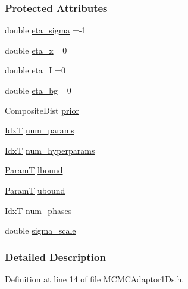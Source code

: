 \subsubsection*{Protected Attributes}
\begin{DoxyCompactItemize}
\item 
double \hyperlink{classmappel_1_1MCMCAdaptor1Ds_adecf7d63c176c03493f914b544895c1c}{eta\+\_\+sigma} =-\/1
\item 
double \hyperlink{classmappel_1_1MCMCAdaptor1D_ae5787e38c9cef6168acf6fc5d3216693}{eta\+\_\+x} =0
\item 
double \hyperlink{classmappel_1_1MCMCAdaptor1D_a5780d326be0c40e10d6c91777cfffbd3}{eta\+\_\+I} =0
\item 
double \hyperlink{classmappel_1_1MCMCAdaptor1D_af54c93421b8e298289cbb92743c6b3d5}{eta\+\_\+bg} =0
\item 
Composite\+Dist \hyperlink{classmappel_1_1PointEmitterModel_a393839f8eb1dd3d61c9369377742ba0e}{prior}
\item 
\hyperlink{namespacemappel_ab17ec0f30b61ece292439d7ece81d3a8}{IdxT} \hyperlink{classmappel_1_1PointEmitterModel_a9af0484391bd6021ddc04ac666ab49ad}{num\+\_\+params}
\item 
\hyperlink{namespacemappel_ab17ec0f30b61ece292439d7ece81d3a8}{IdxT} \hyperlink{classmappel_1_1PointEmitterModel_ab2423214fdd81c8212118770b5b17b1f}{num\+\_\+hyperparams}
\item 
\hyperlink{classmappel_1_1PointEmitterModel_a665ec6aea3aac139bb69a23c06d4b9a1}{ParamT} \hyperlink{classmappel_1_1PointEmitterModel_a889bc82f74cfa654da121e5770296ab2}{lbound}
\item 
\hyperlink{classmappel_1_1PointEmitterModel_a665ec6aea3aac139bb69a23c06d4b9a1}{ParamT} \hyperlink{classmappel_1_1PointEmitterModel_a35b883e84b6a2e0093bdf482c623beef}{ubound}
\item 
\hyperlink{namespacemappel_ab17ec0f30b61ece292439d7ece81d3a8}{IdxT} \hyperlink{classmappel_1_1MCMCAdaptorBase_a44b90a984ace712584074dc17831fe25}{num\+\_\+phases}
\item 
double \hyperlink{classmappel_1_1MCMCAdaptorBase_a76312f7d589bf3f3e754beca174b884b}{sigma\+\_\+scale}
\end{DoxyCompactItemize}


\subsubsection{Detailed Description}


Definition at line 14 of file M\+C\+M\+C\+Adaptor1\+Ds.\+h.



